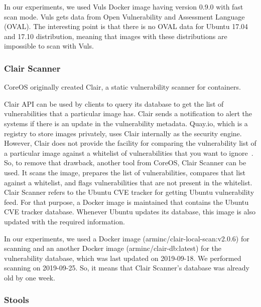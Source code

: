 \documentclass[a4paper,num-refs]{oup-contemporary}
\begin{document}
In our experiments, we used Vuls Docker image having version 0.9.0 with fast scan mode.
Vuls gets data from Open Vulnerability and Assessment Language (OVAL).
The interesting point is that there is no OVAL data for Ubuntu 17.04 and 17.10 distribution,
meaning that images with these distributions are impossible to scan with Vuls.

\subsubsection{Clair Scanner}

CoreOS originally created Clair, a static vulnerability scanner for containers. 

Clair API can be used by clients to query its database to get
the list of vulnerabilities that a particular image has. Clair sends a notification
to alert the systems if there is an update in the vulnerability metadata. Quay.io, which
is a registry to store images privately, uses Clair internally as the security engine. However, Clair does not 
provide the facility for comparing
the vulnerability list of a particular image against a whitelist of vulnerabilities that you
want to ignore~\cite{arminc_2019}. 
So, to remove
that drawback, another tool from CoreOS, Clair Scanner can be used. It scans the image, prepares the list of
vulnerabilities, compares that list against a whitelist, and flags vulnerabilities
that are not present in the whitelist.
Clair Scanner refers to the Ubuntu CVE tracker for getting Ubuntu vulnerability feed.
For that purpose, a Docker image is maintained that contains the Ubuntu CVE tracker database.
Whenever Ubuntu updates its database, this image is also updated with the required information.

In our experiments, we used a Docker image (arminc/clair-local-scan:v2.0.6) for scanning
and an another Docker image (arminc/clair-db:latest) for the vulnerability database, which was
last updated on 2019-09-18. We performed
scanning on 2019-09-25. So, it means that Clair Scanner's database was already
old by one week.

\subsubsection{Stools}
\end{document}
